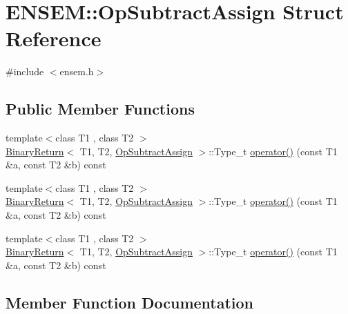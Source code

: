 \hypertarget{structENSEM_1_1OpSubtractAssign}{}\section{E\+N\+S\+EM\+:\+:Op\+Subtract\+Assign Struct Reference}
\label{structENSEM_1_1OpSubtractAssign}


{\ttfamily \#include $<$ensem.\+h$>$}

\subsection*{Public Member Functions}
\begin{DoxyCompactItemize}
\item 
{\footnotesize template$<$class T1 , class T2 $>$ }\\\mbox{\hyperlink{structENSEM_1_1BinaryReturn}{Binary\+Return}}$<$ T1, T2, \mbox{\hyperlink{structENSEM_1_1OpSubtractAssign}{Op\+Subtract\+Assign}} $>$\+::Type\+\_\+t \mbox{\hyperlink{structENSEM_1_1OpSubtractAssign_a8de7df08fa13e2efc8c47c28b8b17887}{operator()}} (const T1 \&a, const T2 \&b) const
\item 
{\footnotesize template$<$class T1 , class T2 $>$ }\\\mbox{\hyperlink{structENSEM_1_1BinaryReturn}{Binary\+Return}}$<$ T1, T2, \mbox{\hyperlink{structENSEM_1_1OpSubtractAssign}{Op\+Subtract\+Assign}} $>$\+::Type\+\_\+t \mbox{\hyperlink{structENSEM_1_1OpSubtractAssign_a8de7df08fa13e2efc8c47c28b8b17887}{operator()}} (const T1 \&a, const T2 \&b) const
\item 
{\footnotesize template$<$class T1 , class T2 $>$ }\\\mbox{\hyperlink{structENSEM_1_1BinaryReturn}{Binary\+Return}}$<$ T1, T2, \mbox{\hyperlink{structENSEM_1_1OpSubtractAssign}{Op\+Subtract\+Assign}} $>$\+::Type\+\_\+t \mbox{\hyperlink{structENSEM_1_1OpSubtractAssign_a8de7df08fa13e2efc8c47c28b8b17887}{operator()}} (const T1 \&a, const T2 \&b) const
\end{DoxyCompactItemize}


\subsection{Member Function Documentation}
\mbox{\label{structENSEM_1_1OpSubtractAssign_a8de7df08fa13e2efc8c47c28b8b17887}} 
